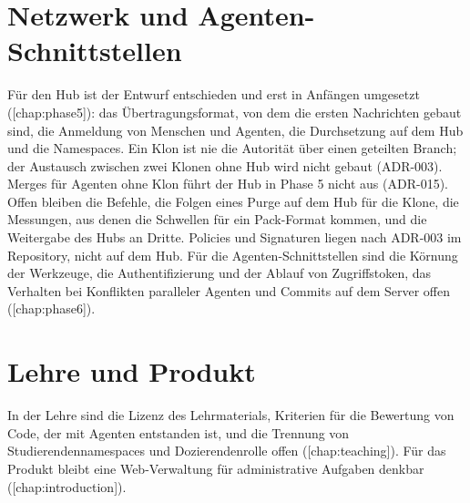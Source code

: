 \section{Netzwerk und Agenten-Schnittstellen}

Für den Hub ist der Entwurf entschieden und erst in Anfängen umgesetzt
([chap:phase5]):
das Übertragungsformat, von dem die ersten Nachrichten gebaut sind, die Anmeldung von Menschen
und Agenten, die Durchsetzung auf dem Hub und die Namespaces.
Ein Klon ist nie die Autorität über einen geteilten Branch; der Austausch zwischen zwei Klonen
ohne Hub wird nicht gebaut (ADR-003).
Merges für Agenten ohne Klon führt der Hub in Phase 5 nicht aus (ADR-015).
Offen bleiben die Befehle, die Folgen eines Purge auf dem Hub für die Klone, die Messungen, aus
denen die Schwellen für ein Pack-Format kommen, und die Weitergabe des Hubs an Dritte.
Policies und Signaturen liegen nach ADR-003 im Repository, nicht auf dem Hub.
Für die Agenten-Schnittstellen sind die Körnung der Werkzeuge, die Authentifizierung und der
Ablauf von Zugriffstoken, das Verhalten bei Konflikten paralleler Agenten und Commits auf dem
Server offen ([chap:phase6]).

\section{Lehre und Produkt}

In der Lehre sind die Lizenz des Lehrmaterials, Kriterien für die Bewertung von Code,
der mit Agenten entstanden ist, und die Trennung von Studierendennamespaces und Dozierendenrolle
offen ([chap:teaching]).
Für das Produkt bleibt eine Web-Verwaltung für administrative Aufgaben denkbar
([chap:introduction]).
